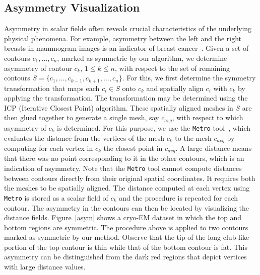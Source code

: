\documentclass[review,journal]{vgtc}         %
\begin{document}
\subsection{Asymmetry Visualization}
Asymmetry in scalar fields often reveals crucial characteristics of the underlying
physical phenomena. For example, asymmetry between 
the left and the right breasts in mammogram images is an indicator of breast 
cancer~\cite{tahmoush2007improved}.
Given a set of contours $c_1,\dots,c_n$, marked as symmetric
by our algorithm, we determine asymmetry of contour $c_k$, $1 \leq k \leq n$, with
respect to the set of remaining contours $S = \{c_1, \dots, c_{k-1}, c_{k+1}, \dots, c_n\}$.
For this, we first determine the symmetry transformation that maps each $c_i \in S$ onto
$c_k$ and spatially align $c_i$ with $c_k$ by applying the transformation. 
The transformation may be determined using the ICP (Iterative Closest Point) algorithm.
These spatially aligned meshes in $S$ are then glued together to generate a single mesh, say $c_{avg}$, 
with respect to which asymmetry of $c_k$ is determined. For this purpose, we use the 
\texttt{Metro} tool~\cite{CigRS98}, which evaluates the distance from the vertices of the mesh 
$c_k$ to the mesh $c_{avg}$ by computing for each vertex in $c_k$ the closest point in $c_{avg}$. 
A large distance means that there was no point corresponding to it in the other contours,
which is an indication of asymmetry. Note that the \texttt{Metro} tool cannot compute distances 
between contours directly from their original spatial coordinates. 
It requires both the meshes to be spatially aligned. 
The distance computed at each vertex using \texttt{Metro} is stored as a scalar field of 
$c_k$ and the procedure is repeated
for each contour. The asymmetry in the contours can then be located by visualizing the distance fields.
Figure~\ref{asym} shows a cryo-EM dataset in which the top and bottom regions are symmetric. The procedure
above is applied to two contours marked as symmetric by our method. Observe that the tip of the long
club-like portion of the top contour is thin while that of the bottom contour is fat. This asymmetry
can be distinguished from the dark red regions that depict vertices with large distance values.
\end{document}
